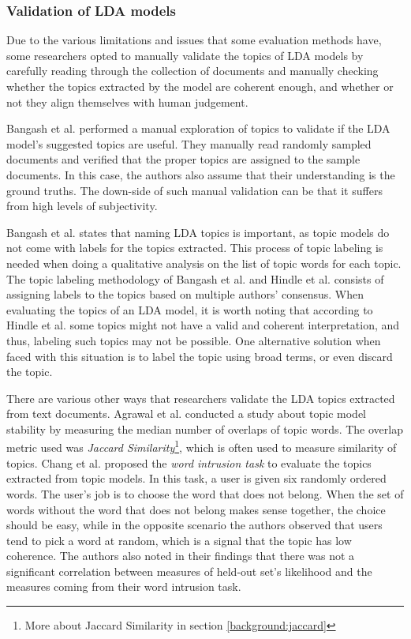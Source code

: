         \subsubsection{Validation of LDA models}
            Due to the various limitations and issues that some evaluation methods have, some researchers opted to manually validate the topics of LDA models by carefully reading through the collection of documents and manually checking whether the topics extracted by the model are coherent enough, and whether or not they align themselves with human judgement. 
            
            Bangash et al. \cite{bangash2019developers} performed a manual exploration of topics to validate if the LDA model's suggested topics are useful. They manually read randomly sampled documents and verified that the proper topics are assigned to the sample documents. In this case, the authors also assume that their understanding is the ground truths. The down-side of such manual validation can be that it suffers from high levels of subjectivity.
             
            \label{topicLabeling} Bangash et al. \cite{bangash2019developers} states that naming LDA topics is important, as topic models do not come with labels for the topics extracted. This process of topic labeling is needed when doing a qualitative analysis on the list of topic words for each topic. The topic labeling methodology of Bangash et al. \cite{bangash2019developers} and Hindle et al. \cite{hindle2012relating} consists of assigning labels to the topics based on multiple authors' consensus. When evaluating the topics of an LDA model, it is worth noting that according to Hindle et al. \cite{hindle2012relating} some topics might not have a valid and coherent interpretation, and thus, labeling such topics may not be possible. One alternative solution when faced with this situation is to label the topic using broad terms, or even discard the topic.
            
            There are various other ways that researchers validate the LDA topics extracted from text documents. Agrawal et al. \cite{agrawal2018wrong} conducted a study about topic model stability by measuring the median number of overlaps of topic words. The overlap metric used was \emph{Jaccard Similarity}\footnote{More about Jaccard Similarity in section \ref{background:jaccard}}, which is often used to measure similarity of topics. Chang et al. \cite{chang2009reading} proposed the \emph{word intrusion task} to evaluate the topics extracted from topic models. In this task, a user is given six randomly ordered words. The user's job is to choose the word that does not belong. When the set of words without the word that does not belong makes sense together, the choice should be easy, while in the opposite scenario the authors observed that users tend to pick a word at random, which is a signal that the topic has low coherence. The authors also noted in their findings that there was not a significant correlation between measures of held-out set's likelihood and the measures coming from their word intrusion task.
        
